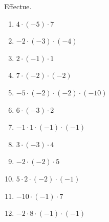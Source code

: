 %
%
    Effectue.
    \begin{enumerate}[cols=3, itemsep=.3cm]
        \item \(4\cdot (-5) \cdot 7\)
        \item \(-2\cdot (-3)\cdot (-4)\)
        \item \(2\cdot (-1)\cdot 1\)
        \item \(7\cdot (-2)\cdot (-2)\)
        \item \(-5\cdot (-2)\cdot (-2)\cdot  (-10)\)
        \item \(6\cdot (-3) \cdot 2\)
        \item \(-1 \cdot 1 \cdot (-1) \cdot (-1)\)
        \item \(3\cdot (-3) \cdot 4\)
        \item \(-2\cdot (-2) \cdot 5\)
        \item \(5 \cdot 2 \cdot (-2) \cdot (-1)\)
        \item \(-10 \cdot (-1) \cdot 7\)
        \item \(-2 \cdot 8 \cdot (-1) \cdot (-1)\)
    \end{enumerate}
